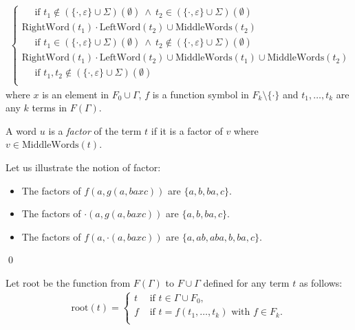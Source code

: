 \documentclass[a4paper]{llncs}
\begin{document}
\begin{definition}
\begin{align*}
\begin{cases}
            \quad\text{ if } t_1\notin (\{\cdot,\varepsilon\}\cup\Sigma)(\emptyset)\ \wedge\ t_2\in (\{\cdot,\varepsilon\}\cup\Sigma)(\emptyset)\\
            \mathrm{RightWord}(t_1)\cdot \mathrm{LeftWord}(t_2) \cup \mathrm{MiddleWords}(t_2)\\
            \quad\text{ if } t_1\in (\{\cdot,\varepsilon\}\cup\Sigma)(\emptyset)\ \wedge\ t_2\notin (\{\cdot,\varepsilon\}\cup\Sigma)(\emptyset)\\
            \mathrm{RightWord}(t_1)\cdot \mathrm{LeftWord}(t_2) \cup \mathrm{MiddleWords}(t_1)\cup \mathrm{MiddleWords}(t_2)\\
            \quad\text{ if } t_1,t_2\notin (\{\cdot,\varepsilon\}\cup\Sigma)(\emptyset)\\
          \end{cases}
        \end{align*}
        where $x$ is an element in $F_0\cup \Gamma$, $f$ is a function symbol in $F_k\setminus\{\cdot\}$ and $t_1,\ldots,t_k$ are any $k$ terms in $F(\Gamma)$.
    
    A word $u$ is a \emph{factor} of the term $t$ if it is a factor of $v$ where $v\in\mathrm{MiddleWords}(t)$. 
  \end{definition}
  
  \begin{example}\label{ex factor term}
    Let us illustrate the notion of factor:
      \begin{itemize}
         \item The factors of $f(a,g(a,baxc))$ are $\{a,b,ba,c\}$.    
         \item The factors of $\cdot(a,g(a,baxc))$ are $\{a,b,ba,c\}$.
         \item The factors of $f(a,\cdot(a,baxc))$ are $\{a,ab,aba,b,ba,c\}$. 
     \end{itemize}
    \qed
  \end{example}
  
  
  \begin{definition}
     Let $\mathrm{root}$ be the function from $F(\Gamma)$ to $F\cup\Gamma$ defined for any term $t$ as follows: 
        \begin{align*}
        \mathrm{root}(t)=
        \begin{cases}
            t & \text{ if } t\in \Gamma\cup F_0,\\
            f & \text{ if }t=f(t_1,\ldots,t_k)\text{ with }f\in F_k.\\
          \end{cases}
        \end{align*}
  \end{definition}
  
\end{document}
